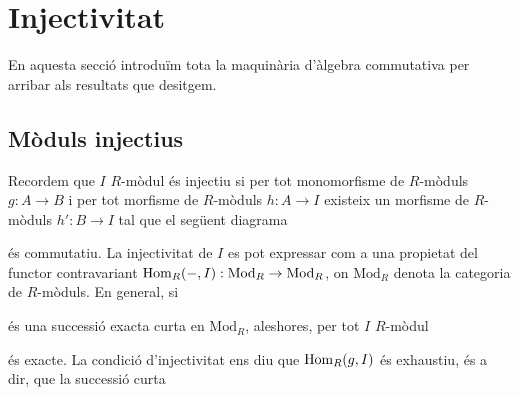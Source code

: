 \section{Injectivitat}
En aquesta secció introduïm tota la maquinària d'àlgebra commutativa per arribar als resultats que desitgem.
\subsection{Mòduls injectius}
Recordem que $I$ $R$-mòdul és injectiu si per tot monomorfisme de $R$-mòduls $g:A\rightarrow B$ i per tot morfisme de $R$-mòduls $h:A\rightarrow I$ existeix un morfisme de $R$-mòduls $h':B\rightarrow I$ tal que el següent diagrama
\begin{center}
\end{center}
és commutatiu.\newline
La injectivitat de $I$ es pot expressar com a una propietat del functor contravariant $\operatorname{Hom}_{R}(-,I):\textrm{Mod}_{R}\rightarrow\textrm{Mod}_{R}$, on $\textrm{Mod}_{R}$ denota la categoria de $R$-mòduls. En general, si
\begin{center}
\end{center}
és una successió exacta curta en $\textrm{Mod}_{R}$, aleshores, per tot $I$ $R$-mòdul
\begin{center}
\end{center}
és exacte. La condició d'injectivitat ens diu que $\operatorname{Hom}_{R}(g,I)$ és exhaustiu, és a dir, que la successió curta
\begin{center}
\end{center}
